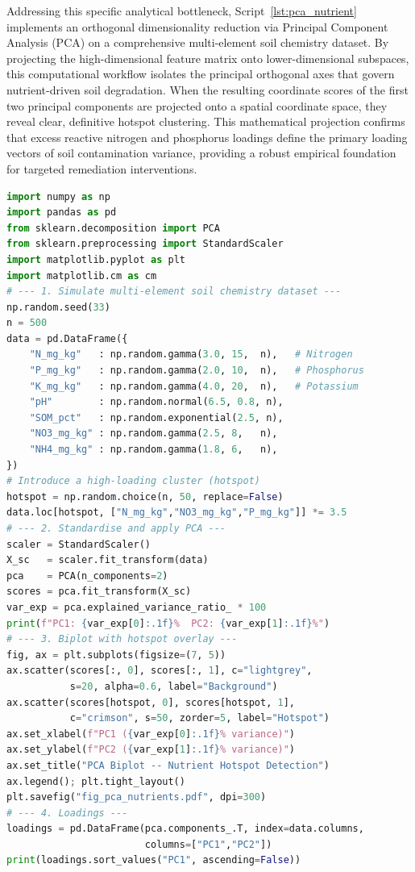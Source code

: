 \documentclass[land,article,submit,pdftex,moreauthors]{Definitions/mdpi}
\begin{document}
Addressing this specific analytical bottleneck, Script~\ref{lst:pca_nutrient} implements an orthogonal dimensionality reduction via Principal Component Analysis (PCA) on a comprehensive multi-element soil chemistry dataset. By projecting the high-dimensional feature matrix onto lower-dimensional subspaces, this computational workflow isolates the principal orthogonal axes that govern nutrient-driven soil degradation. When the resulting coordinate scores of the first two principal components are projected onto a spatial coordinate space, they reveal clear, definitive hotspot clustering. This mathematical projection confirms that excess reactive nitrogen and phosphorus loadings define the primary loading vectors of soil contamination variance, providing a robust empirical foundation for targeted remediation interventions.

\begin{lstlisting}[language=Python,basicstyle=\scriptsize\ttfamily,
    caption={Python workflow: PCA-based dimensionality reduction and
             nutrient hotspot identification from multi-element soil
             chemistry data (Script~5).},
    label={lst:pca_nutrient}]
import numpy as np
import pandas as pd
from sklearn.decomposition import PCA
from sklearn.preprocessing import StandardScaler
import matplotlib.pyplot as plt
import matplotlib.cm as cm
# --- 1. Simulate multi-element soil chemistry dataset ---
np.random.seed(33)
n = 500
data = pd.DataFrame({
    "N_mg_kg"   : np.random.gamma(3.0, 15,  n),   # Nitrogen
    "P_mg_kg"   : np.random.gamma(2.0, 10,  n),   # Phosphorus
    "K_mg_kg"   : np.random.gamma(4.0, 20,  n),   # Potassium
    "pH"        : np.random.normal(6.5, 0.8, n),
    "SOM_pct"   : np.random.exponential(2.5, n),
    "NO3_mg_kg" : np.random.gamma(2.5, 8,   n),
    "NH4_mg_kg" : np.random.gamma(1.8, 6,   n),
})
# Introduce a high-loading cluster (hotspot)
hotspot = np.random.choice(n, 50, replace=False)
data.loc[hotspot, ["N_mg_kg","NO3_mg_kg","P_mg_kg"]] *= 3.5
# --- 2. Standardise and apply PCA ---
scaler = StandardScaler()
X_sc   = scaler.fit_transform(data)
pca    = PCA(n_components=2)
scores = pca.fit_transform(X_sc)
var_exp = pca.explained_variance_ratio_ * 100
print(f"PC1: {var_exp[0]:.1f}%  PC2: {var_exp[1]:.1f}%")
# --- 3. Biplot with hotspot overlay ---
fig, ax = plt.subplots(figsize=(7, 5))
ax.scatter(scores[:, 0], scores[:, 1], c="lightgrey",
           s=20, alpha=0.6, label="Background")
ax.scatter(scores[hotspot, 0], scores[hotspot, 1],
           c="crimson", s=50, zorder=5, label="Hotspot")
ax.set_xlabel(f"PC1 ({var_exp[0]:.1f}% variance)")
ax.set_ylabel(f"PC2 ({var_exp[1]:.1f}% variance)")
ax.set_title("PCA Biplot -- Nutrient Hotspot Detection")
ax.legend(); plt.tight_layout()
plt.savefig("fig_pca_nutrients.pdf", dpi=300)
# --- 4. Loadings ---
loadings = pd.DataFrame(pca.components_.T, index=data.columns,
                        columns=["PC1","PC2"])
print(loadings.sort_values("PC1", ascending=False))
\end{lstlisting}
\end{document}
